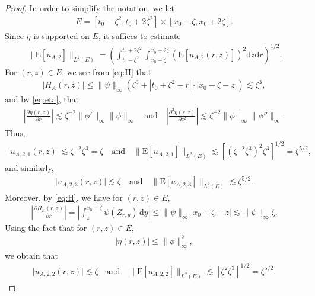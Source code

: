 \documentclass[12pt,a4paper]{article}
\newcommand{\E}{\mathrm{E}}
\renewcommand{\d}{\mathrm{d}}
\newcommand {\deltah}{{\zeta}}
\newcommand{\<}{\langle}
\renewcommand{\>}{\rangle}
\begin{document}
\begin{proof}
In order to simplify the notation, we let
\begin{align}\label{eq:E}
E=[t_0-\deltah^2, t_0+2\deltah^2]\times [x_0-\deltah, x_0+2\deltah].
\end{align}
 Since $\eta$ is supported on $E$, it suffices to estimate 
\begin{align*}
            \|\E[u_{A,2}]\|_{L^2(E)}=\left( \int_{t_0-\deltah^2}^{t_0+2\deltah^2}\int_{x_0-\deltah}^{x_0+2\deltah}\left(\E[u_{A,2}(r,z)]\right)^{2}\d z\d r\right)^{1/2}. 
 \end{align*}
For $(r,z)\in E$, we see from \eqref{eq:H} that
           \begin{align}\label{eq:HA}
           |H_A(r,z)|\leq \|\psi\|_{\infty}(\deltah^3+ |t_0+\deltah^2-r|\cdot|x_0+\deltah-z|) \lesssim \deltah^3,
           \end{align}
and by \eqref{eq:eta}, that
 \begin{align}\label{eq:etabound}
           \left|\frac{\partial\eta(r,z)}{\partial r}\right| \lesssim \deltah^{-2}\|\phi'\|_{\infty}\|\phi\|_{\infty}\quad \text{and}\quad 
                      \left|\frac{\partial^2\eta(r,z)}{\partial z^2}\right| \lesssim \deltah^{-2} \|\phi\|_{\infty}\|\phi''\|_{\infty}.
           \end{align}
Thus, 
\begin{align}\label{eq:u1}
    \vert u_{A,2,1}(r, z) \vert \lesssim \zeta^{-2} \zeta^3 = \zeta \quad\text{and}\quad       \|\E[u_{A,2,1}]\|_{L^2(E)}\lesssim  \left[(\deltah^{-2}\deltah^3)^2\deltah^3\right]^{1/2}= \deltah^{5/2},
\end{align}
and similarly, 
\begin{align}\label{eq:u3}
      \vert u_{A,2,3}(r, z) \vert \lesssim  \zeta \quad\text{and}\quad       \|\E[u_{A,2,3}]\|_{L^2(E)}\lesssim \deltah^{5/2}.
\end{align}
Moreover, by \eqref{eq:H}, we have for $(r,z)\in E$,
           \begin{align}\label{eq:HA2}
           \left|\frac{\partial H_A(r,z)}{\partial r} \right|= \left|\int_z^{x_0+\deltah}\psi(Z_{r, y})\, \d y\right|
            \leq \|\psi\|_{\infty}|x_0+\deltah-z| \lesssim \|\psi\|_{\infty}\deltah.
           \end{align}
Using the fact that for $(r,z)\in E$,
           \begin{align}\label{eq:eta2}
           |\eta(r,z)|\leq \|\phi\|_{\infty}^2,
           \end{align}
 we obtain that
 \begin{align}\label{eq:u2}
      \vert u_{A,2,2}(r, z) \vert \lesssim  \zeta \quad\text{and}\quad       \|\E[u_{A,2,2}]\|_{L^2(E)}\lesssim  [\deltah^2\deltah^3]^{1/2}=\deltah ^{5/2}.
\end{align}
           

\end{proof}
\end{document}
